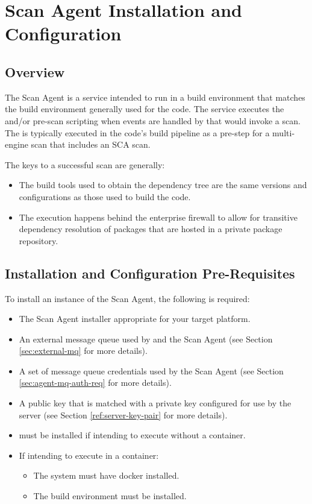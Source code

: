 \section{Scan Agent Installation and Configuration}\label{sec:scan-agent}

\subsection{Overview}

The Scan Agent is a service intended to run in a build environment that
matches the build environment generally used for the code.  The service executes
the \scaresolver and/or pre-scan scripting when events are handled by \cxoneflow that would invoke a scan.
The \scaresolver is typically executed in the code's build pipeline as a pre-step
for a multi-engine \cxone scan that includes an SCA scan.

The keys to a successful \scaresolver scan are generally:

\begin{itemize}
  \item The build tools used to obtain the dependency tree are the same versions and
    configurations as those used to build the code.
  \item The execution happens behind the enterprise firewall to allow for transitive
    dependency resolution of packages that are hosted in a private package repository.
\end{itemize}


\subsection{Installation and Configuration Pre-Requisites}

To install an instance of the Scan Agent, the following is required:

\begin{itemize}
  \item The Scan Agent installer appropriate for your target platform.
  \item An external message queue used by \cxoneflow and the Scan Agent (see Section \ref{sec:external-mq} for more details).
  \item A set of message queue credentials used by the Scan Agent (see Section \ref{sec:agent-mq-auth-req} for more details).
  \item A public key that is matched with a private key configured for use by the \cxoneflow server (see Section \ref{ref:server-key-pair} for more details).
  \item \scaresolver must be installed if intending to execute \scaresolver without a container.
  \item If intending to execute \scaresolver in a container:
  \begin{itemize}
    \item The system must have docker installed.
    \item The \toolkit build environment must be installed.
  \end{itemize}
\end{itemize}


